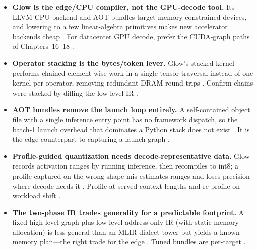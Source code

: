 \begin{itemize}
\item \textbf{Glow is the edge/CPU compiler, not the GPU-decode tool.}
Its LLVM CPU backend and AOT bundles target memory-constrained devices, and lowering to a few linear-algebra primitives makes new accelerator backends cheap \citep{rotem2018glow,pytorchglow2024}. For datacenter GPU decode, prefer the CUDA-graph paths of Chapters~16--18 \citep{nvidia2024cudagraphs}.

\item \textbf{Operator stacking is the bytes/token lever.}
Glow's stacked kernel performs chained element-wise work in a single tensor traversal instead of one kernel per operator, removing redundant DRAM round trips \citep{pytorchglow2024,memoryfloor2026}. Confirm chains were stacked by diffing the low-level IR \citep{taxbreak2026}.

\item \textbf{AOT bundles remove the launch loop entirely.}
A self-contained object file with a single inference entry point has no framework dispatch, so the batch-1 launch overhead that dominates a Python stack does not exist \citep{rotem2018glow,taxbreak2026}. It is the edge counterpart to capturing a launch graph \citep{nvidia2024cudagraphs}.

\item \textbf{Profile-guided quantization needs decode-representative data.}
Glow records activation ranges by running inference, then recompiles to int8; a profile captured on the wrong shape mis-estimates ranges and loses precision where decode needs it \citep{rotem2018glow,kwon2023vllm}. Profile at served context lengths and re-profile on workload shift \citep{patel2025llminference}.

\item \textbf{The two-phase IR trades generality for a predictable footprint.}
A fixed high-level graph plus low-level address-only IR (with static memory allocation) is less general than an MLIR dialect tower but yields a known memory plan---the right trade for the edge \citep{rotem2018glow,dlbook}. Tuned bundles are per-target \citep{amd2024xdna}.
\end{itemize}

